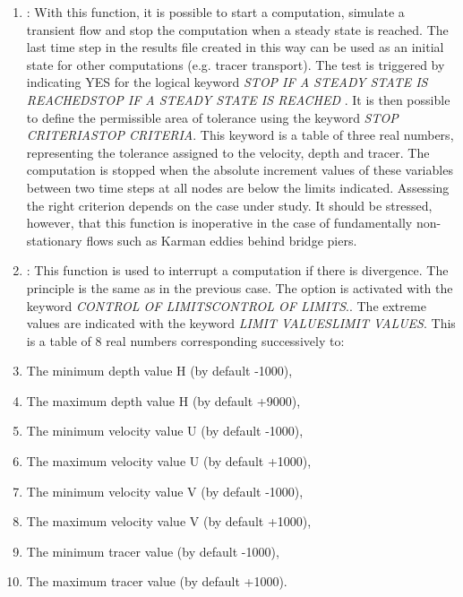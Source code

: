 \begin{enumerate}
\item  {}: With this function, it is possible to start a computation, simulate a transient flow and stop the computation when a steady state is reached. The last time step in the results file created in this way can be used as an initial state for other computations (e.g. tracer transport). The test is triggered by indicating YES for the logical keyword \textit{STOP IF A STEADY STATE IS REACHEDSTOP IF A STEADY STATE IS REACHED} . It is then possible to define the permissible area of tolerance using the keyword \textit{STOP CRITERIASTOP CRITERIA}. This keyword is a table of three real numbers, representing the tolerance assigned to the velocity, depth and tracer. The computation is stopped when the absolute increment values of these variables between two time steps at all nodes are below the limits indicated. Assessing the right criterion depends on the case under study. It should be stressed, however, that this function is inoperative in the case of fundamentally non-stationary flows such as Karman eddies behind bridge piers.

\item  {}: This function is used to interrupt a computation if there is divergence. The principle is the same as in the previous case. The option is activated with the keyword \textit{CONTROL OF LIMITSCONTROL OF LIMITS}.. The extreme values are indicated with the keyword \textit{LIMIT VALUESLIMIT VALUES}. This is a table of 8 real numbers corresponding successively to:

\item  The minimum depth value H (by default -1000),

\item  The maximum depth value H (by default +9000),

\item  The minimum velocity value U (by default -1000),

\item  The maximum velocity value U (by default +1000),

\item  The minimum velocity value V (by default -1000),

\item  The maximum velocity value V (by default +1000),

\item  The minimum tracer value (by default -1000),

\item  The maximum tracer value (by default +1000).
\end{enumerate}


